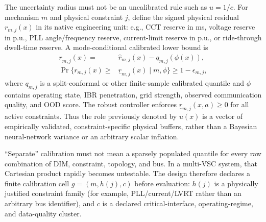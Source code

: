 \documentclass[conference]{IEEEtran}
\begin{document}
The uncertainty radius must not be an uncalibrated rule such as $u=1/c$. For mechanism $m$ and physical constraint $j$, define the signed physical residual $r_{m,j}(x)$ in its native engineering unit: e.g., CCT reserve in ms, voltage reserve in p.u., PLL angle/frequency reserve, current-limit reserve in p.u., or ride-through dwell-time reserve. A mode-conditional calibrated lower bound is
\begin{equation}
\begin{aligned}
\underline r_{m,j}(x)={}&\widehat r_{m,j}(x)-
q_{m,j}\!\left(\phi(x)\right),\\
\Pr\{r_{m,j}(x)\geq{}&\underline r_{m,j}(x)\mid m,\phi\}
\geq1-\epsilon_{m,j},
\end{aligned}
\label{eq:physicalu}
\end{equation}
where $q_{m,j}$ is a split-conformal or other finite-sample calibrated quantile and $\phi$ contains operating state, IBR penetration, grid strength, observed communication quality, and OOD score. The robust controller enforces $\underline r_{m,j}(x,a)\geq0$ for all active constraints. Thus the role previously denoted by $u(x)$ is a vector of empirically validated, constraint-specific physical buffers, rather than a Bayesian neural-network variance or an arbitrary scalar inflation.

``Separate'' calibration must not mean a sparsely populated quantile for every raw combination of DIM, constraint, topology, and bus. In a multi-VSC system, that Cartesian product rapidly becomes untestable. The design therefore declares a finite calibration cell $g=(m,h(j),c)$ before evaluation: $h(j)$ is a physically justified constraint family (for example, PLL/current/LVRT rather than an arbitrary bus identifier), and $c$ is a declared critical-interface, operating-regime, and data-quality cluster.
\end{document}
